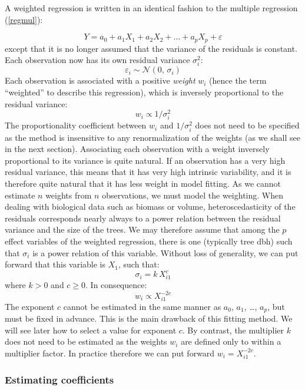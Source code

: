 A weighted regression is written in an identical fashion to the multiple regression (\ref{regmul}):

\[
Y=a_0+a_1X_1+a_2X_2+\ldots+a_pX_p+\varepsilon
\]
except that it is no longer assumed that the variance of the residuals is constant. Each observation now has its own residual variance $\sigma_i^2$:
\[
\varepsilon_i\sim\mathcal{N}(0,\,\sigma_i)
\]
Each observation is associated with a positive \emph{weight} $w_i$ (hence the term ``weighted'' to describe this regression), which is inversely proportional to the residual variance:
\[
w_i\propto1/\sigma_i^2
\]
The proportionality coefficient between $w_i$ and $1/\sigma_i^2$ does not need to be specified as the method is insensitive to any renormalization of the weights (as we shall see in the next section). Associating each observation with a weight inversely proportional to its variance is quite natural. If an observation has a very high residual variance, this means that it has very high intrinsic variability, and it is therefore quite natural that it has less weight in model fitting. As we cannot estimate $n$ weights from $n$ observations, we must model the weighting. When dealing with biological data such as biomass or volume, heteroscedasticity of the residuals corresponds nearly always to a power relation between the residual variance and the size of the trees. We may therefore assume that among the $p$ effect variables of the weighted regression, there is one (typically tree dbh) such that $\sigma_i$ is a power relation of this variable. Without loss of generality, we can put forward that this variable is $X_1$, such that:
\[
\sigma_i=k\,X_{i1}^c
\]
where $k>0$ and $c\geq0$. In consequence:
\[
w_i\propto X_{i1}^{-2c}
\]
The exponent $c$ cannot be estimated in the same manner as $a_0$, $a_1$, \ldots, $a_p$, but must be fixed in advance. This is the main drawback of this fitting method. We will see later how to select a value for exponent $c$. By contrast, the multiplier $k$ does not need to be estimated as the weights $w_i$ are defined only to within a multiplier factor. In practice therefore we can put forward $w_i=X_{i1}^{-2c}$.

\subsubsection{Estimating coefficients}

